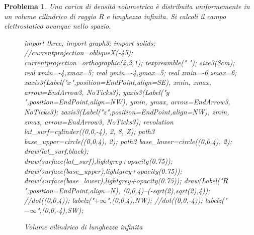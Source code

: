 \documentclass[a4paper,oneside]{article}
\newtheorem{problema}{Problema}
\let\oldhat\hat
\renewcommand{\vec}[1]{\mathbf{#1}}
\renewcommand{\hat}[1]{\widehat{\mathbf{#1}}}
\begin{document}
\begin{problema}
	Una carica di densità volumetrica è distribuita uniformemente in un 
	volume cilindrico di raggio $R$ e lunghezza infinita. Si calcoli 
	il campo elettrostatico ovunque nello spazio.
	\begin{figure}%
			\centering
			\begin{asy}[height=6cm,inline=true,attach=false,viewportwidth=\linewidth]
				import three;
				import graph3;
				import solids;
				//currentprojection=obliqueX(-45);
				currentprojection=orthographic(2,2,1);
				texpreamble("\let\oldhat\hat
				\renewcommand{\vec}[1]{\mathbf{#1}}
				\renewcommand{\hat}[1]{\oldhat{\mathbf{#1}}}");
				size3(8cm);
				real xmin=-4,xmax=5;
				real ymin=-4,ymax=5;
				real zmin=-6,zmax=6;
				xaxis3(Label("\small $x$",position=EndPoint,align=SE),
				xmin, xmax, arrow=EndArrow3, NoTicks3);
				yaxis3(Label("\small $y$",position=EndPoint,align=NW),
				ymin, ymax, arrow=EndArrow3, NoTicks3);
				zaxis3(Label("\small $z$",position=EndPoint,align=NW),
				zmin, zmax, arrow=EndArrow3, NoTicks3);
				revolution lat_surf=cylinder((0,0,-4), 2, 8, Z);
				path3 base_upper=circle((0,0,4), 2);
				path3 base_lower=circle((0,0,4), 2);
				draw(lat_surf,black);
				draw(surface(lat_surf),lightgrey+opacity(0.75));
				draw(surface(base_upper),lightgrey+opacity(0.75));
				draw(surface(base_lower),lightgrey+opacity(0.75));
				draw(Label("$R$",position=EndPoint,align=N),
				(0,0,4)--(-sqrt(2),sqrt(2),4));
				//dot((0,0,4));
				labelz("$+\infty$",(0,0,4),NW);
				//dot((0,0,-4));
				labelz("$-\infty$",(0,0,-4),SW);
			\end{asy}
			\caption{Volume cilindrico di lunghezza infinita}
			\label{fig:cilindro_pieno_infinito}
		\end{figure}	
\end{problema}
\end{document}
